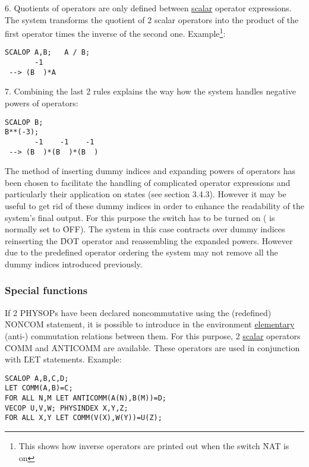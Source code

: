 6. Quotients of operators are only defined between
\underline{scalar} operator expressions.
The system transforms the quotient of 2 scalar operators into the
product of the first operator times the inverse of the second one.
Example\footnote{This shows how inverse operators are printed out when
the switch \f{NAT} is on}: 

\begin{verbatim}
SCALOP A,B;   A / B;
       -1
 --> (B  )*A
\end{verbatim}

7. Combining the  last 2 rules explains the way how the system
handles negative powers of operators: 

\noindent
\begin{verbatim}
SCALOP B;
B**(-3);
       -1    -1    -1
 --> (B  )*(B  )*(B  )
\end{verbatim}


The method of inserting dummy indices and expanding powers of
operators has been chosen to facilitate the handling of
complicated operator
expressions and particularly their application  on states
(see section 3.4.3). However it may be useful to get rid of these
dummy indices in order to enhance the readability of the
system's final output.
\hypertarget{switch:CONTRACT}{}%
For this purpose the switch   has to
be turned on ( is normally set to \f{OFF}).
The system in this case contracts over dummy indices reinserting the
\f{DOT} operator and reassembling the expanded powers.  However due to
the predefined operator ordering the system may not remove all the
dummy indices introduced previously.

\subsubsection{Special functions}


If 2 PHYSOPs have been declared noncommutative using the (redefined)
\f{NONCOM} statement, it is possible to introduce in the environment
\underline{elementary} (anti-) commutation relations between them. For
this purpose,
2 \underline{scalar} operators \f{COMM}  and
\f{ANTICOMM}  are available.
These operators are used in conjunction with \f{LET} statements.
Example: 

\begin{verbatim}
SCALOP A,B,C,D;
LET COMM(A,B)=C;
FOR ALL N,M LET ANTICOMM(A(N),B(M))=D;
VECOP U,V,W; PHYSINDEX X,Y,Z;
FOR ALL X,Y LET COMM(V(X),W(Y))=U(Z);
\end{verbatim}

